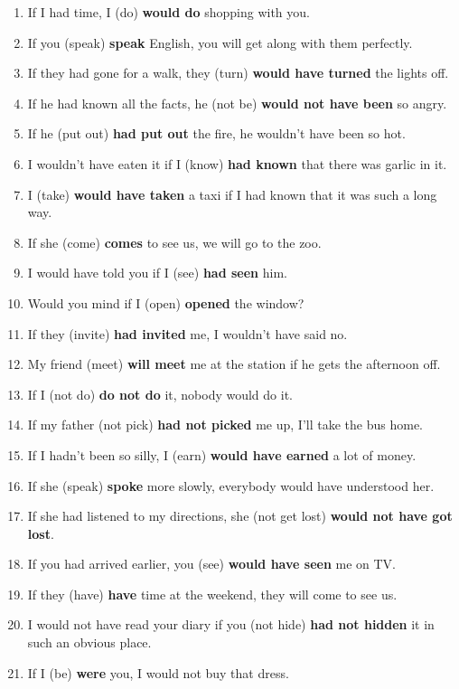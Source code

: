 \documentclass{article}
\begin{document}
\begin{enumerate}
    \item If I had time, I (do) \textbf{would do} shopping with you.
    \item If you (speak) \textbf{speak} English, you will get along with them perfectly.
    \item If they had gone for a walk, they (turn) \textbf{would have turned} the lights off.
    \item If he had known all the facts, he (not be) \textbf{would not have been} so angry.
    \item If he (put out) \textbf{had put out} the fire, he wouldn't have been so hot.
    \item I wouldn't have eaten it if I (know) \textbf{had known} that there was garlic in it.
    \item I (take) \textbf{would have taken} a taxi if I had known that it was such a long way.
    \item If she (come) \textbf{comes} to see us, we will go to the zoo.
    \item I would have told you if I (see) \textbf{had seen} him.
    \item Would you mind if I (open) \textbf{opened} the window?
    \item If they (invite) \textbf{had invited} me, I wouldn't have said no.
    \item My friend (meet) \textbf{will meet} me at the station if he gets the afternoon off.
    \item If I (not do) \textbf{do not do} it, nobody would do it.
    \item If my father (not pick) \textbf{had not picked} me up, I'll take the bus home.
    \item If I hadn't been so silly, I (earn) \textbf{would have earned} a lot of money.
    \item If she (speak) \textbf{spoke} more slowly, everybody would have understood her.
    \item If she had listened to my directions, she (not get lost) \textbf{would not have got lost}.
    \item If you had arrived earlier, you (see) \textbf{would have seen} me on TV.
    \item If they (have) \textbf{have} time at the weekend, they will come to see us.
    \item I would not have read your diary if you (not hide) \textbf{had not hidden} it in such an obvious place.
    \item If I (be) \textbf{were} you, I would not buy that dress.

\end{enumerate}
\end{document}
